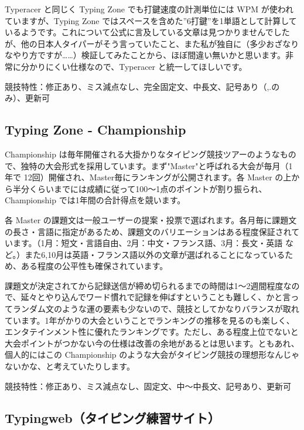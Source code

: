 Typeracer と同じく Typing Zone でも打鍵速度の計測単位には WPM が使われていますが、Typing Zone ではスペースを含めた”6打鍵”を1単語として計算しているようです。これについて公式に言及している文章は見つかりませんでしたが、他の日本人タイパーがそう言っていたこと、また私が独自に（多少おざなりなやり方ですが……）検証してみたことから、ほぼ間違い無いかと思います。非常に分かりにくい仕様なので、Typeracer と統一してほしいです。

競技特性：修正あり、ミス減点なし、完全固定文、中長文、記号あり（,.のみ）、更新可

\subsection{Typing Zone - Championship}

Championship は毎年開催される大掛かりなタイピング競技ツアーのようなもので、独特の大会形式を採用しています。まず"Master"と呼ばれる大会が毎月（1年で 12回）開催され、Master毎にランキングが公開されます。各 Master の上から半分くらいまでには成績に従って100～1点のポイントが割り振られ、Championship では1年間の合計得点を競います。

各 Master の課題文は一般ユーザーの提案・投票で選ばれます。各月毎に課題文の長さ・言語に指定があるため、課題文のバリエーションはある程度保証されています。（1月：短文・言語自由、2月：中文・フランス語、3月：長文・英語 など。）また6,10月は英語・フランス語以外の文章が選ばれることになっているため、ある程度の公平性も確保されています。

課題文が決定されてから記録送信が締め切られるまでの時間は1～2週間程度なので、延々とやり込んでワード慣れで記録を伸ばすということも難しく、かと言ってランダム文のような運の要素も少ないので、競技としてかなりバランスが取れています。1年がかりの大会ということでランキングの推移を見るのも楽しく、エンタテインメント性に優れたランキングです。ただし、ある程度上位でないと大会ポイントがつかない今の仕様は改善の余地があるとは思います。ともあれ、個人的にはこの Championship のような大会がタイピング競技の理想形なんじゃないかな、と考えていたりします。

競技特性：修正あり、ミス減点なし、固定文、中～中長文、記号あり、更新可

\subsection{Typingweb（タイピング練習サイト）}


